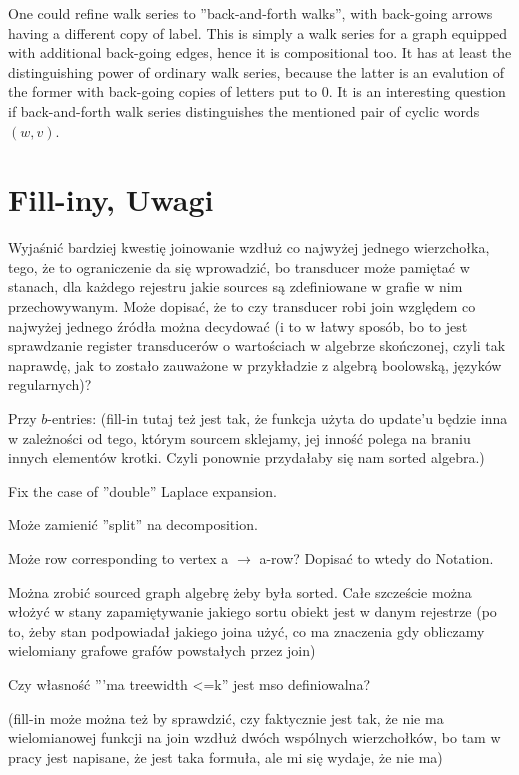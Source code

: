 One could refine walk series to ''back-and-forth walks'', with back-going arrows having a different copy of label. This is simply a walk series for a graph equipped with additional back-going edges, hence it is compositional too. It has at least the distinguishing power of ordinary walk series, because the latter is an evalution of the former with back-going copies of letters put to 0. It is an interesting question if back-and-forth walk series distinguishes the mentioned pair of cyclic words $(w,v)$.

\section{Fill-iny, Uwagi}
Wyjaśnić bardziej kwestię joinowanie wzdłuż co najwyżej jednego wierzchołka, tego, że to ograniczenie da się wprowadzić, bo transducer może pamiętać w stanach, dla każdego rejestru jakie sources są zdefiniowane w grafie w nim przechowywanym. Może dopisać, że to czy transducer robi join względem co najwyżej jednego źródła można decydować (i to w łatwy sposób, bo to jest sprawdzanie register transducerów o wartościach w algebrze skończonej, czyli tak naprawdę, jak to zostało zauważone w przykładzie z algebrą boolowską, języków regularnych)?

Przy $b$-entries: (fill-in tutaj też jest tak, że funkcja użyta do update'u będzie inna w zależności od tego, którym sourcem sklejamy, jej inność polega na braniu innych elementów krotki. Czyli ponownie przydałaby się nam sorted algebra.)

Fix the case of ''double'' Laplace expansion.

Może zamienić ''split'' na decomposition.

Może row corresponding to vertex a $\rightarrow$ a-row? Dopisać to wtedy do Notation.

Można zrobić sourced graph algebrę żeby była sorted. Całe szczeście można włożyć w stany zapamiętywanie jakiego sortu obiekt jest w danym rejestrze (po to, żeby stan podpowiadał jakiego joina użyć, co ma znaczenia gdy obliczamy wielomiany grafowe grafów powstałych przez join)

Czy własność '''ma treewidth <=k'' jest mso definiowalna?

(fill-in może można też by sprawdzić, czy faktycznie jest tak, że nie ma wielomianowej funkcji na join wzdłuż dwóch wspólnych wierzchołków, bo tam w pracy jest napisane, że jest taka formuła, ale mi się wydaje, że nie ma)



